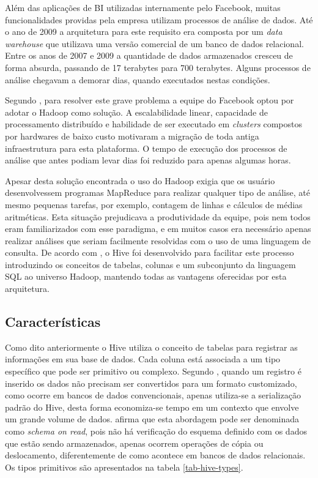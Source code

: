 Além das aplicações de BI utilizadas internamente pelo Facebook, muitas funcionalidades providas pela empresa utilizam processos de análise de dados. Até o ano de 2009 a arquitetura para este requisito era composta por um \textit{data warehouse} que utilizava uma versão comercial de um banco de dados relacional. Entre os anos de 2007 e 2009 a quantidade de dados armazenados cresceu de forma absurda, passando de 17 terabytes para 700 terabytes. Alguns processos de análise chegavam a demorar dias, quando executados nestas condições.

Segundo , para resolver este grave problema a equipe do Facebook optou por adotar o Hadoop como solução. A escalabilidade linear, capacidade de processamento distribuído e habilidade de ser executado em \textit{clusters} compostos por hardwares de baixo custo motivaram a migração de toda antiga infraestrutura para esta plataforma. O tempo de execução dos processos de análise que antes podiam levar dias foi reduzido para apenas algumas horas.

Apesar desta solução encontrada o uso do Hadoop exigia que os usuário desenvolvessem programas MapReduce para realizar qualquer tipo de análise, até mesmo pequenas tarefas, por exemplo, contagem de linhas e cálculos de médias aritméticas. Esta situação prejudicava a produtividade da equipe, pois nem todos eram familiarizados com esse paradigma, e em muitos casos era necessário apenas realizar análises que seriam facilmente resolvidas com o uso de uma linguagem de consulta. De acordo com , o Hive foi desenvolvido para facilitar este processo introduzindo os conceitos de tabelas, colunas e um subconjunto da linguagem SQL ao universo Hadoop, mantendo todas as vantagens oferecidas por esta arquitetura.

\subsection{Características}

Como dito anteriormente o Hive utiliza o conceito de tabelas para registrar as informações em sua base de dados. Cada coluna está associada a um tipo específico que pode ser primitivo ou complexo. Segundo , quando um registro é inserido os dados não precisam ser convertidos para um formato customizado, como ocorre em bancos de dados convencionais, apenas utiliza-se a serialização padrão do Hive, desta forma economiza-se tempo em um contexto que envolve um grande volume de dados.  afirma que esta abordagem pode ser denominada como \textit{schema on read}, pois não há verificação do esquema definido com os dados que estão sendo armazenados, apenas ocorrem operações de cópia ou deslocamento, diferentemente de como acontece em bancos de dados relacionais. Os tipos primitivos são apresentados na tabela \ref{tab-hive-types}.

